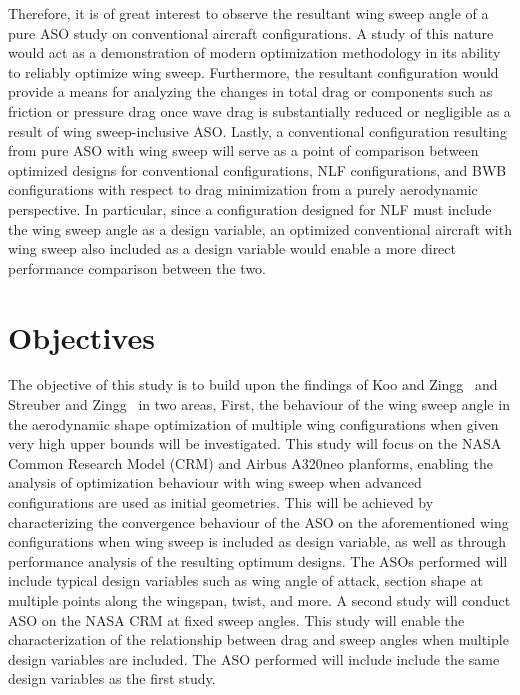 Therefore, it is of great interest to observe the resultant wing sweep angle of a pure ASO study on conventional aircraft configurations. A study of this nature would act as a demonstration of modern optimization methodology in its ability to reliably optimize wing sweep. Furthermore, the resultant configuration would provide a means for analyzing the changes in total drag or components such as friction or pressure drag once wave drag is substantially reduced or negligible as a result of wing sweep-inclusive ASO. Lastly, a conventional configuration resulting from pure ASO with wing sweep will serve as a point of comparison between optimized designs for conventional configurations, NLF configurations, and BWB configurations with respect to drag minimization from a purely aerodynamic perspective. In particular, since a configuration designed for NLF must include the wing sweep angle as a design variable, an optimized conventional aircraft with wing sweep also included as a design variable would enable a more direct performance comparison between the two.

\section{Objectives}
The objective of this study is to build upon the findings of Koo and Zingg~\cite{koo_investigation_2018} and Streuber and Zingg~\cite{streuber_investigation_2017, streuber_evaluating_2021} in two areas, First, the behaviour of the wing sweep angle in the aerodynamic shape optimization of multiple wing configurations when given very high upper bounds will be investigated. This study will focus on the NASA Common Research Model (CRM) and Airbus A320neo planforms, enabling the analysis of optimization behaviour with wing sweep when advanced configurations are used as initial geometries. This will be achieved by characterizing the convergence behaviour of the ASO on the aforementioned wing configurations when wing sweep is included as design variable, as well as through performance analysis of the resulting optimum designs. The ASOs performed will include typical design variables such as wing angle of attack, section shape at multiple points along the wingspan, twist, and more. A second study will conduct ASO on the NASA CRM at fixed sweep angles. This study will enable the characterization of the relationship between drag and sweep angles when multiple design variables are included. The ASO performed will include include the same design variables as the first study.